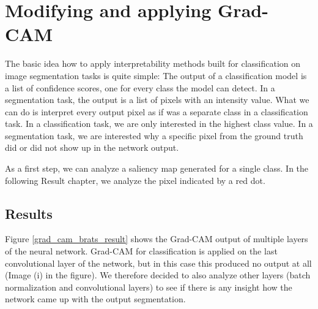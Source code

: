 \section{Modifying and applying Grad-CAM}

The basic idea how to apply interpretability methods built for classification on image segmentation tasks is quite simple: The output of a classification model
is a list of confidence scores, one for every class the model can detect. In a segmentation task, the output is a list of pixels with an intensity value.
What we can do is interpret every output pixel as if was a separate class in a classification task.
In a classification task, we are only interested in the highest class value. In a segmentation task, we are interested why a specific pixel from the ground truth did
or did not show up in the network output.

As a first step, we can analyze a saliency map generated for a single class. In the following Result chapter, we analyze the pixel indicated by a red dot.

\subsection{Results}

Figure \ref{grad_cam_brats_result} shows the Grad-CAM output of multiple layers of the neural network. Grad-CAM for classification is applied on the last convolutional layer
of the network, but in this case this produced no output at all (Image (i) in the figure). We therefore decided to also analyze other layers (batch normalization and convolutional layers)
to see if there is any insight how the network came up with the output segmentation.

